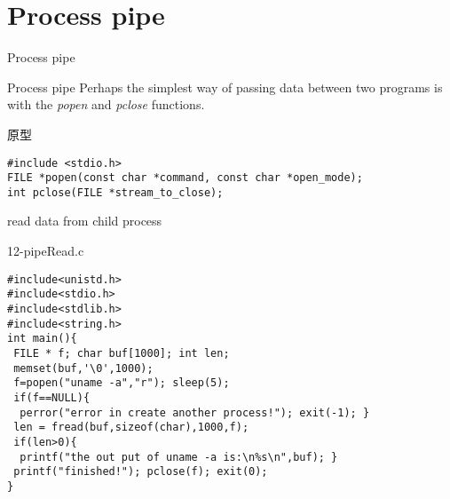 \documentclass{beamer}
\begin{document}
\section{Process pipe}
\begin{frame}
\Huge{\centerline{Process pipe}}
\end{frame}
\begin{frame}[fragile]{Process pipe}
Perhaps the simplest way of passing data between two programs is with the \emph{popen} and \emph{pclose} functions. 
\begin{block}{原型}
\begin{verbatim}
#include <stdio.h>
FILE *popen(const char *command, const char *open_mode);
int pclose(FILE *stream_to_close);
\end{verbatim}
\end{block}
\end{frame}

\begin{frame}[fragile]{read data from child process}
\begin{block}{12-pipeRead.c}
\begin{verbatim}
#include<unistd.h>
#include<stdio.h>
#include<stdlib.h>
#include<string.h>
int main(){
 FILE * f; char buf[1000]; int len;
 memset(buf,'\0',1000);
 f=popen("uname -a","r"); sleep(5);
 if(f==NULL){
  perror("error in create another process!"); exit(-1); }
 len = fread(buf,sizeof(char),1000,f);
 if(len>0){
  printf("the out put of uname -a is:\n%s\n",buf); }	
 printf("finished!"); pclose(f); exit(0);
}
\end{verbatim}
\end{block}
\end{frame}
\end{document}
